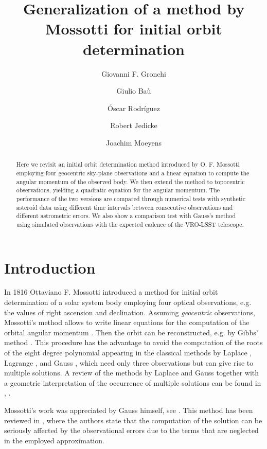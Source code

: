 \documentclass[11pt]{article}
\title{\bf Generalization of a method by Mossotti for initial orbit determination}
\author[1]{Giovanni F. Gronchi}
\author[1]{Giulio Ba\`u}
\author[1]{\'Oscar Rodr\'iguez}
\author[2]{Robert Jedicke}
\author[3]{Joachim Moeyens}
\affil[1]{Dipartimento di Matematica, Universit\`a di Pisa, Italy}
\affil[2]{Institute for Astronomy, University of Hawai`i, USA}
\affil[3]{Vera C. Rubin Observatory, University of Washington, USA}
\begin{document}
\maketitle

\begin{abstract}
Here we revisit an initial orbit determination method introduced by O. F. Mossotti employing four geocentric sky-plane observations and a linear equation to compute the angular momentum of the observed body.  
We then extend the method to topocentric observations,  yielding a quadratic equation for the angular momentum. 
The performance of the two versions are compared through numerical tests with synthetic asteroid data using different time intervals between consecutive observations and different astrometric errors.
We also show a comparison test with Gauss's method using simulated observations with the expected cadence of the VRO-LSST telescope.
\end{abstract}



\section{Introduction}

In 1816 Ottaviano F. Mossotti introduced a method for initial orbit determination of a solar system body employing four optical observations, e.g. the values of right ascension and declination. 
Assuming {\em geocentric} observations, Mossotti's method allows to write linear equations for the computation of the orbital angular momentum \cite{mossotti}. 
Then the orbit can be reconstructed, e.g. by Gibbs' method \cite{Herrick}. 
This procedure has the advantage to avoid the computation of the roots of the eight degree polynomial appearing in the classical methods by Laplace \cite{laplace}, Lagrange \cite{lagrange}, and Gauss \cite{gauss1809}, which need only three observations but can give rise to multiple solutions. 
A review of the methods by Laplace and Gauss together with a geometric interpretation of the occurrence of multiple solutions can be found in \cite{gronchi2009}, \cite{mg2010}.

Mossotti's work was appreciated by Gauss himself, see \cite{gausswerkeVI}.  
This method has been reviewed in \cite{cellpinz}, where the authors state that the computation of the solution can be seriously affected by the observational errors due to the terms that are neglected in the employed approximation.
\end{document}
